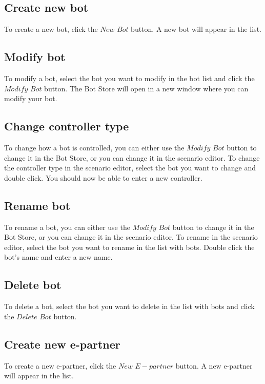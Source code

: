 \documentclass[a4paper]{article}
\begin{document}
\subsection{Create new bot}
To create a new bot, click the $New$ $Bot$ button. A new bot will appear in the list.%

\subsection{Modify bot}
To modify a bot, select the bot you want to modify in the bot list and click the $Modify$ $Bot$ button. The Bot Store will open in a new window where you can modify your bot.

\subsection{Change controller type}
To change how a bot is controlled, you can either use the $Modify$ $Bot$ button to change it in the Bot Store, or you can change it in the scenario editor. To change the controller type in the scenario editor, select the bot you want to change and double click. You should now be able to enter a new controller.

\subsection{Rename bot}
To rename a bot, you can either use the $Modify$ $Bot$ button to change it in the Bot Store, or you can change it in the scenario editor. To rename in the scenario editor, select the bot you want to rename in the list with bots. Double click the bot's name and enter a new name. %

\subsection{Delete bot}
To delete a bot, select the bot you want to delete in the list with bots and click the $Delete$ $Bot$ button.

\subsection{Create new e-partner}
To create a new e-partner, click the $New$ $E-partner$ button. A new e-partner will appear in the list.%
\end{document}
